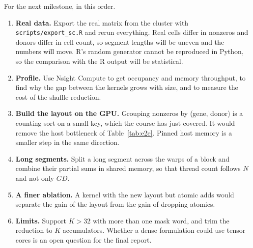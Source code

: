 \documentclass[sigconf,nonacm]{acmart}
\newcommand{\file}[1]{{\urlstyle{tt}\nolinkurl{#1}}}   %
\begin{document}
For the next milestone, in this order.
\begin{enumerate}
\item \textbf{Real data.} Export the real matrix from the cluster with \file{scripts/export_sc.R}
and rerun everything. Real cells differ in nonzeros and donors differ in cell count, so segment
lengths will be uneven and the numbers will move. R's random generator cannot be reproduced in
Python, so the comparison with the R output will be statistical.
\item \textbf{Profile.} Use Nsight Compute to get occupancy and memory throughput, to find why the
gap between the kernels grows with size, and to measure the cost of the shuffle reduction.
\item \textbf{Build the layout on the GPU.} Grouping nonzeros by (gene, donor) is a counting sort on
a small key, which the course has just covered. It would remove the host bottleneck of
Table~\ref{tab:e2e}. Pinned host memory is a smaller step in the same direction.
\item \textbf{Long segments.} Split a long segment across the warps of a block and combine their
partial sums in shared memory, so that thread count follows $N$ and not only $GD$.
\item \textbf{A finer ablation.} A kernel with the new layout but atomic adds would separate the
gain of the layout from the gain of dropping atomics.
\item \textbf{Limits.} Support $K > 32$ with more than one mask word, and trim the reduction to $K$
accumulators. Whether a dense formulation could use tensor cores is an open question for the final
report.
\end{enumerate}



\end{document}
